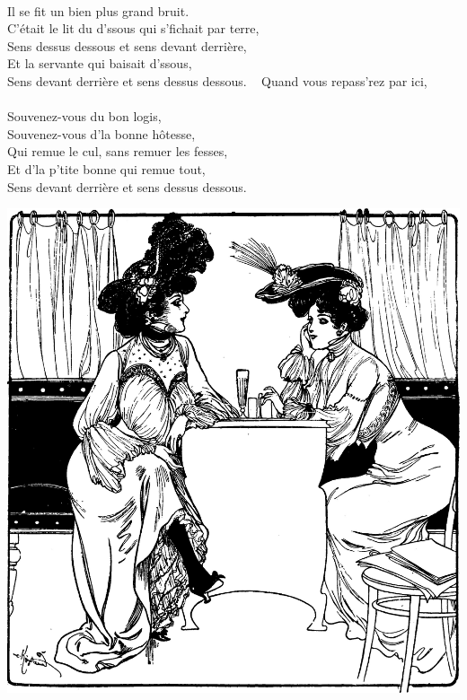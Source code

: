 \\Il se fit un bien plus grand bruit. ~~~~~~~~~~~~~\bissimple
\\C'était le lit du d'ssous qui s'fichait par terre,
\\Sens dessus dessous et sens devant derrière,
\\Et la servante qui baisait d'ssous,
\\Sens devant derrière et sens dessus dessous. ~ \bissimple
\breakpage
Quand vous repass'rez par ici, ~~~~~~~~~~~~~~~~\bissimple
\\Souvenez-vous du bon logis, ~~~~~~~~~~~~~~~\bissimple
\\Souvenez-vous d'la bonne hôtesse,
\\Qui remue le cul, sans remuer les fesses,
\\Et d'la p'tite bonne qui remue tout,
\\Sens devant derrière et sens dessus dessous. \bissimple
\\
\bigskip
\begin{center}
\includegraphics[width=1\textwidth]{images/brev3.png}
\end{center}

\breakpage